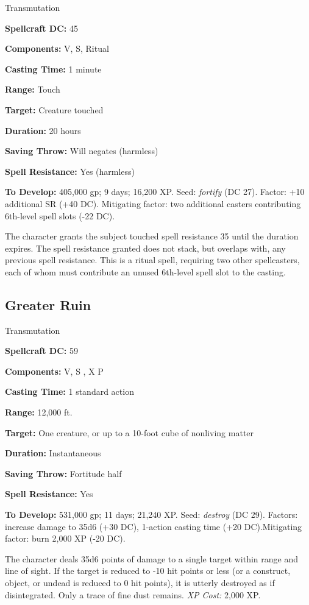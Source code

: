 \documentclass{article}
\begin{document}
Transmutation 

\textbf{Spellcraft DC:} 45 

\textbf{Components:} V, S, Ritual 

\textbf{Casting Time:} 1 minute 

\textbf{Range:} Touch 

\textbf{Target:} Creature touched 

\textbf{Duration:} 20 hours 

\textbf{Saving Throw:} Will negates (harmless) 

\textbf{Spell Resistance:} Yes (harmless) 

\textbf{To Develop:} 405,000 gp; 9 days; 16,200 XP. Seed: \textit{fortify }(DC 
27). Factor: +10 additional SR (+40 DC). Mitigating factor: two additional casters 
contributing 6th-level spell slots (-22 DC). 

The character grants the subject touched spell resistance 35 until the duration 
expires. The spell resistance granted does not stack, but overlaps with, any previous 
spell resistance. This is a ritual spell, requiring two other spellcasters, each 
of whom must contribute an unused 6th-level spell slot to the casting. 

\vspace{12pt}
\subsection*{Greater Ruin }

Transmutation 

\textbf{Spellcraft DC:} 59 

\textbf{Components:} V, S , X P 

\textbf{Casting Time:} 1 standard action

\textbf{Range:} 12,000 ft. 

\textbf{Target:} One creature, or up to a 10-foot cube of nonliving matter 

\textbf{Duration:} Instantaneous 

\textbf{Saving Throw:} Fortitude half 

\textbf{Spell Resistance:} Yes 

\textbf{To Develop:} 531,000 gp; 11 days; 21,240 XP. Seed: \textit{destroy }(DC 
29). Factors: increase damage to 35d6 (+30 DC), 1-action casting time (+20 DC).Mitigating 
factor: burn 2,000 XP (-20 DC). 

The character deals 35d6 points of damage to a single target within range and line 
of sight. If the target is reduced to -10 hit points or less (or a construct, object, 
or undead is reduced to 0 hit points), it is utterly destroyed as if disintegrated. 
Only a trace of fine dust remains. \textit{XP Cost: }2,000 XP.
\end{document}
